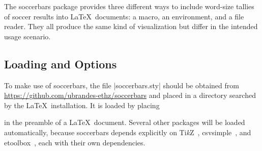 \documentclass[a4paper,12pt]{ltxdoc}
\begin{document}
The \textsf{soccerbars} package
provides three different ways
to include word-size tallies of soccer results
into \LaTeX\ documents: a macro, an environment, and a file reader. 
They all produce the same kind of visualization 
but differ in the intended usage scenario.


\subsection{Loading and Options}\label{sec:options}

To make use of \textsf{soccerbars},
the file |soccerbars.sty| should be
obtained from \url{https://github.com/ubrandes-ethz/soccerbars}
and placed in a directory
searched by the \LaTeX\ installation.
It is loaded by placing
\begin{quote}
\end{quote}
in the preamble of a \LaTeX\ document. 
Several other packages will be loaded automatically,
because \textsf{soccerbars} depends explicitly on
Ti\emph{k}Z~\cite{tikz}, \textsf{csvsimple}~\cite{csvsimple}, and \textsf{etoolbox}~\cite{etoolbox},
each with their own dependencies.
\end{document}
